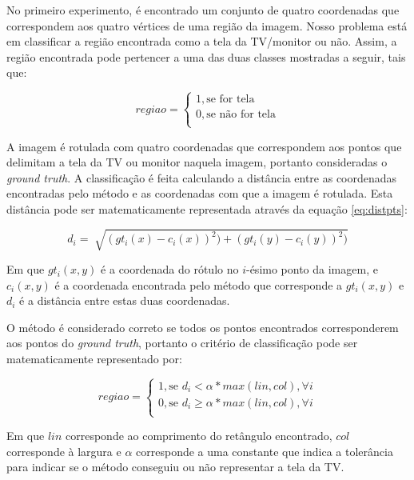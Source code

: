 
No primeiro experimento, é encontrado um conjunto de quatro coordenadas que correspondem aos quatro vértices de uma região da imagem. Nosso problema está em classificar a região encontrada como a tela da TV/monitor ou não. Assim, a região encontrada pode pertencer a uma das duas classes mostradas a seguir, tais que:

\begin{equation} \label{eq:class0}
regiao = \begin{cases}
		1, \text{se for tela} \\ 
        0, \text{se não for tela} \\
        \end{cases}
\end{equation}

A imagem é rotulada com quatro coordenadas que correspondem aos pontos que delimitam a tela da TV ou monitor naquela imagem, portanto consideradas o \textit{ground truth}. A classificação é feita calculando a distância entre as coordenadas encontradas pelo método e as coordenadas com que a imagem é rotulada. Esta distância pode ser matematicamente representada através da equação \ref{eq:distpts}:

\begin{equation} \label{eq:distpts}
d_i = \sqrt[]{(gt_i(x)-c_i(x))^2)+(gt_i(y)-c_i(y))^2)}
\end{equation}

Em que $gt_i(x,y)$ é a coordenada do rótulo no $i$-ésimo ponto da imagem, e $c_i(x,y)$  é a coordenada encontrada pelo método que corresponde a $gt_i(x,y)$ e $d_i$ é a distância entre estas duas coordenadas.

O método é considerado correto se todos os pontos encontrados corresponderem aos pontos do \textit{ground truth}, portanto o critério de classificação pode ser matematicamente representado por:

\begin{equation} \label{eq:class1}
regiao = \begin{cases}
		1, \text{se } d_i < \alpha*max(lin,col), \forall i \\ 
        0, \text{se } d_i \geq \alpha*max(lin,col), \forall i \\
        \end{cases}
\end{equation}

Em que $lin$ corresponde ao comprimento do retângulo encontrado, $col$ corresponde à largura e $\alpha$ corresponde a uma constante que indica a tolerância para indicar se o método conseguiu ou não representar a tela da TV.

